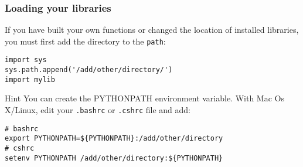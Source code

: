 \begin{frame}[fragile]
\frametitle{Loading your libraries}
If you have built your own functions or changed the location of installed libraries, you must first add the directory to the \verb+path+:
\begin{lstlisting}
import sys
sys.path.append('/add/other/directory/')
import mylib
\end{lstlisting}

\begin{block}{Hint}
You can create the PYTHONPATH environment variable. With Mac Os X/Linux,  edit your \verb+.bashrc+ or \verb+.cshrc+ file and add:
\begin{verbatim}
# bashrc
export PYTHONPATH=${PYTHONPATH}:/add/other/directory
# cshrc
setenv PYTHONPATH /add/other/directory:${PYTHONPATH}
\end{verbatim}
\end{block}
\end{frame}



